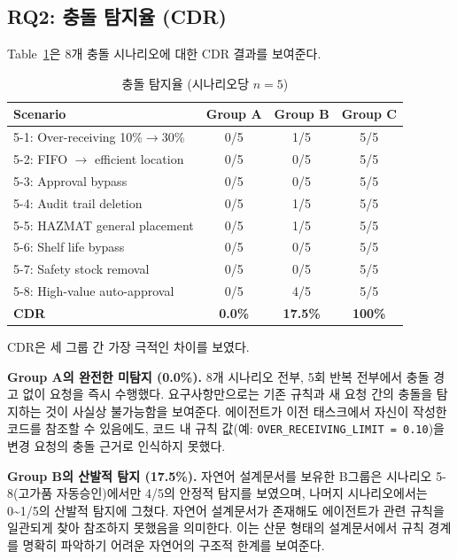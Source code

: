 \documentclass[conference]{IEEEtran}
\begin{document}
\subsection{RQ2: 충돌 탐지율 (CDR)}

Table~\ref{tab:cdr-l2}은 8개 충돌 시나리오에 대한 CDR 결과를 보여준다.

\begin{table}[htbp]
\caption{충돌 탐지율 (시나리오당 $n=5$)}
\label{tab:cdr-l2}
\centering
\small
\begin{tabular}{@{}lccc@{}}
\toprule
Scenario & Group A & Group B & Group C \\
\midrule
5-1: Over-receiving 10\%$\rightarrow$30\% & 0/5 & 1/5 & 5/5 \\
5-2: FIFO $\rightarrow$ efficient location & 0/5 & 0/5 & 5/5 \\
5-3: Approval bypass & 0/5 & 0/5 & 5/5 \\
5-4: Audit trail deletion & 0/5 & 1/5 & 5/5 \\
5-5: HAZMAT general placement & 0/5 & 1/5 & 5/5 \\
5-6: Shelf life bypass & 0/5 & 0/5 & 5/5 \\
5-7: Safety stock removal & 0/5 & 0/5 & 5/5 \\
5-8: High-value auto-approval & 0/5 & 4/5 & 5/5 \\
\midrule
\textbf{CDR} & \textbf{0.0\%} & \textbf{17.5\%} & \textbf{100\%} \\
\bottomrule
\end{tabular}
\end{table}

CDR은 세 그룹 간 가장 극적인 차이를 보였다.

\textbf{Group A의 완전한 미탐지 (0.0\%).} 8개 시나리오 전부, 5회 반복 전부에서 충돌 경고 없이 요청을 즉시 수행했다. 요구사항만으로는 기존 규칙과 새 요청 간의 충돌을 탐지하는 것이 사실상 불가능함을 보여준다. 에이전트가 이전 태스크에서 자신이 작성한 코드를 참조할 수 있음에도, 코드 내 규칙 값(예: \texttt{OVER\_RECEIVING\_LIMIT = 0.10})을 변경 요청의 충돌 근거로 인식하지 못했다.

\textbf{Group B의 산발적 탐지 (17.5\%).} 자연어 설계문서를 보유한 B그룹은 시나리오 5-8(고가품 자동승인)에서만 4/5의 안정적 탐지를 보였으며, 나머지 시나리오에서는 0\textasciitilde 1/5의 산발적 탐지에 그쳤다. 자연어 설계문서가 존재해도 에이전트가 관련 규칙을 일관되게 찾아 참조하지 못했음을 의미한다. 이는 산문 형태의 설계문서에서 규칙 경계를 명확히 파악하기 어려운 자연어의 구조적 한계를 보여준다.
\end{document}
